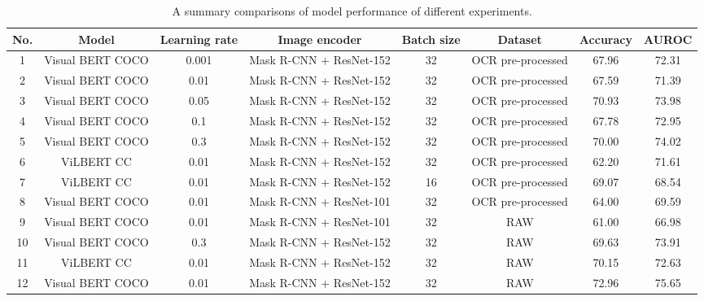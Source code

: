 \documentclass[10pt,twocolumn,letterpaper]{article}
\begin{document}
\begin{table}
\begin{center}
\begin{tabular}{c|c|c|c|c|c|c|c}
\hline
No. & Model & Learning rate & Image encoder & Batch size & Dataset & Accuracy & AUROC \\
\hline\hline
1 & Visual BERT COCO & 0.001 & Mask R-CNN + ResNet-152 & 32 & OCR pre-processed & 67.96 & 72.31 \\
\hline
2 & Visual BERT COCO & 0.01 & Mask R-CNN + ResNet-152 & 32 & OCR pre-processed & 67.59 & 71.39 \\
\hline
3 & Visual BERT COCO & 0.05 & Mask R-CNN + ResNet-152 & 32 & OCR pre-processed & 70.93 & 73.98 \\
\hline
4 & Visual BERT COCO & 0.1 & Mask R-CNN + ResNet-152 & 32 & OCR pre-processed & 67.78 & 72.95 \\
\hline
5 & Visual BERT COCO & 0.3 & Mask R-CNN + ResNet-152 & 32 & OCR pre-processed & 70.00 & 74.02 \\
\hline
6 & ViLBERT CC & 0.01 & Mask R-CNN + ResNet-152 & 32 & OCR pre-processed & 62.20 & 71.61 \\
\hline
7 & ViLBERT CC & 0.01 & Mask R-CNN + ResNet-152 & 16 & OCR pre-processed & 69.07 & 68.54 \\
\hline
8 & Visual BERT COCO & 0.01 & Mask R-CNN + ResNet-101 & 32 & OCR pre-processed & 64.00 & 69.59 \\
\hline
9 & Visual BERT COCO & 0.01 & Mask R-CNN + ResNet-101 & 32 & RAW & 61.00 & 66.98 \\
\hline
10 & Visual BERT COCO & 0.3 & Mask R-CNN + ResNet-152 & 32 & RAW & 69.63 & 73.91 \\
\hline
11 & ViLBERT CC & 0.01 & Mask R-CNN + ResNet-152 & 32 & RAW & 70.15 & 72.63 \\
\hline
12 & Visual BERT COCO & 0.01 & Mask R-CNN + ResNet-152 & 32 & RAW & 72.96 & 75.65 \\
\hline
\end{tabular}
\end{center}
\caption{A summary comparisons of model performance of different experiments.}
\label{tab:summary}
\end{table}
\end{document}
